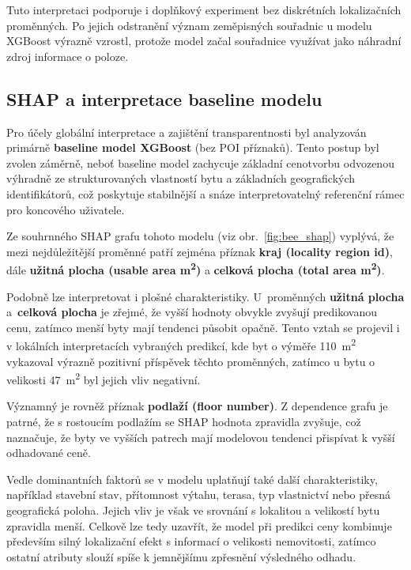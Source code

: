 Tuto interpretaci podporuje i doplňkový experiment bez diskrétních lokalizačních proměnných. Po jejich odstranění význam zeměpisných souřadnic u modelu XGBoost výrazně vzrostl, protože model začal souřadnice využívat jako náhradní zdroj informace o poloze.

\subsection{SHAP a interpretace baseline modelu}
Pro účely globální interpretace a zajištění transparentnosti byl analyzován primárně \textbf{baseline model XGBoost} (bez POI příznaků). Tento postup byl zvolen záměrně, neboť baseline model zachycuje základní cenotvorbu odvozenou výhradně ze strukturovaných vlastností bytu a základních geografických identifikátorů, což poskytuje stabilnější a snáze interpretovatelný referenční rámec pro koncového uživatele.

Ze souhrnného SHAP grafu tohoto modelu (viz obr.~\ref{fig:bee_shap}) vyplývá, že mezi nejdůležitější proměnné patří zejména příznak \textbf{kraj (locality region id)}, dále \textbf{užitná plocha (usable area m\textsuperscript{2})} a \textbf{celková plocha (total area m\textsuperscript{2})}.

Podobně lze interpretovat i plošné charakteristiky. U~proměnných \textbf{užitná plocha} a~\textbf{celková plocha} je zřejmé, že vyšší hodnoty obvykle zvyšují predikovanou cenu, zatímco menší byty mají tendenci působit opačně. Tento vztah se projevil i v lokálních interpretacích vybraných predikcí, kde byt o výměře 110~m\textsuperscript{2} vykazoval výrazně pozitivní příspěvek těchto proměnných, zatímco u bytu o velikosti 47~m\textsuperscript{2} byl jejich vliv negativní.

Významný je rovněž příznak \textbf{podlaží (floor number)}. Z dependence grafu je patrné, že s rostoucím podlažím se SHAP hodnota zpravidla zvyšuje, což naznačuje, že byty ve vyšších patrech mají modelovou tendenci přispívat k vyšší odhadované ceně.

Vedle dominantních faktorů se v modelu uplatňují také další charakteristiky, například stavební stav, přítomnost výtahu, terasa, typ vlastnictví nebo přesná geografická poloha. Jejich vliv je však ve srovnání s lokalitou a velikostí bytu zpravidla menší. Celkově lze tedy uzavřít, že model při predikci ceny kombinuje především silný lokalizační efekt s informací o velikosti nemovitosti, zatímco ostatní atributy slouží spíše k jemnějšímu zpřesnění výsledného odhadu.

